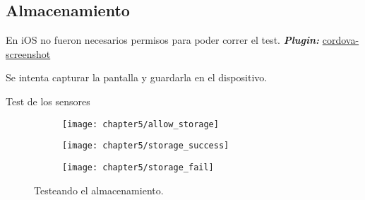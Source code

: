 \subsection*{Almacenamiento}
En iOS no fueron necesarios permisos para poder correr el test.
\textbf{\emph{Plugin:}} \href{https://github.com/gitawego/cordova-screenshot}{cordova-screenshot}\\
\begin{algorithm}
	\begin{algorithmic}[1]
		\STATE Se intenta capturar la pantalla y guardarla en el dispositivo.
	\end{algorithmic}
	\caption{Test de los sensores}\label{alg:chap5_test_storage}
\end{algorithm}
\begin{figure}[!ht]
	\begin{subfigure}{.32\textwidth}
	    \centering
		\texttt{[image: chapter5/allow\_storage]}
		\label{fig:chapter05:storage_allow}
	\end{subfigure}
	\begin{subfigure}{.32\textwidth}
	    \centering
		\texttt{[image: chapter5/storage\_success]}
		\label{fig:chapter05:storage_success}
	\end{subfigure}
	\begin{subfigure}{.32\textwidth}
	    \centering
		\texttt{[image: chapter5/storage\_fail]}
		\label{fig:chapter05:storage_fail}
	\end{subfigure}
	\caption{Testeando el almacenamiento.}
	\label{fig:chapter05:storage_test}
\end{figure}
